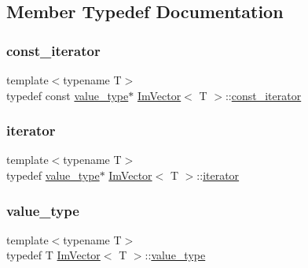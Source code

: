\subsection{Member Typedef Documentation}
\mbox{\label{structImVector_aedeac9c5080f9d6ce96ae837768ee4c4}} 
\subsubsection{\texorpdfstring{const\+\_\+iterator}{const\_iterator}}
{\footnotesize\ttfamily template$<$typename T$>$ \\
typedef const \hyperlink{structImVector_a8bd77e4e7581d8e5f9e98d7c2f3c2a80}{value\+\_\+type}$\ast$ \hyperlink{structImVector}{Im\+Vector}$<$ T $>$\+::\hyperlink{structImVector_aedeac9c5080f9d6ce96ae837768ee4c4}{const\+\_\+iterator}}

\mbox{\label{structImVector_a74b5478f1f6fd471cc71219bce483db6}} 
\subsubsection{\texorpdfstring{iterator}{iterator}}
{\footnotesize\ttfamily template$<$typename T$>$ \\
typedef \hyperlink{structImVector_a8bd77e4e7581d8e5f9e98d7c2f3c2a80}{value\+\_\+type}$\ast$ \hyperlink{structImVector}{Im\+Vector}$<$ T $>$\+::\hyperlink{structImVector_a74b5478f1f6fd471cc71219bce483db6}{iterator}}

\mbox{\label{structImVector_a8bd77e4e7581d8e5f9e98d7c2f3c2a80}} 
\subsubsection{\texorpdfstring{value\+\_\+type}{value\_type}}
{\footnotesize\ttfamily template$<$typename T$>$ \\
typedef T \hyperlink{structImVector}{Im\+Vector}$<$ T $>$\+::\hyperlink{structImVector_a8bd77e4e7581d8e5f9e98d7c2f3c2a80}{value\+\_\+type}}



